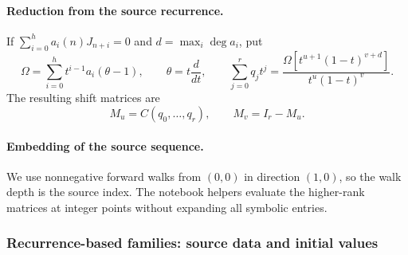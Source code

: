 \documentclass[oneside,english,11pt]{amsart}
\begin{document}
\smallskip
\paragraph{\textbf{Reduction from the source recurrence.}}
If
$\sum_{i=0}^h a_i(n)J_{n+i}=0$ and $d=\max_i\deg a_i$, put
\[
 \Omega=\sum_{i=0}^h t^{i-1}a_i(\theta-1),\qquad
 \theta=t\frac{d}{dt},\qquad
 \sum_{j=0}^r q_jt^j
 =\frac{\Omega[t^{u+1}(1-t)^{v+d}]}{t^u(1-t)^v}.
\]
The resulting shift matrices are
\[
 M_u=C(q_0,\ldots,q_r),\qquad M_v=I_r-M_u.
\]

\smallskip
\paragraph{\textbf{Embedding of the source sequence.}}
We use nonnegative forward walks from
$(0,0)$ in direction $(1,0)$, so the walk depth is the source index.
The notebook helpers evaluate the higher-rank matrices at integer
points without expanding all symbolic entries.

\subsubsection{Recurrence-based families: source data and initial values}
\smallskip
\end{document}
